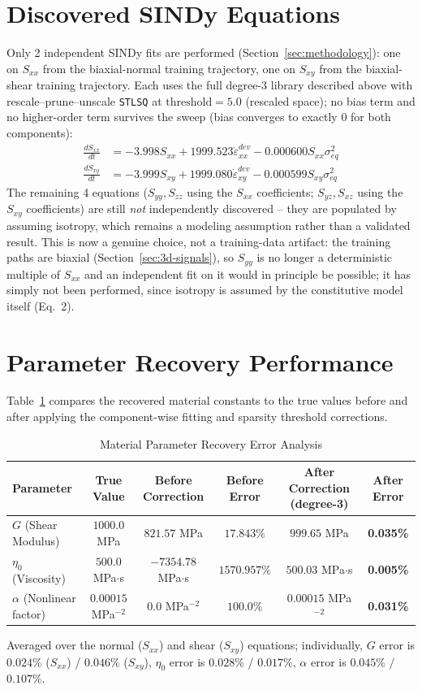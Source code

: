 \documentclass{article}
\begin{document}
\section{Discovered SINDy Equations}
\label{sec:results-degree3}
Only 2 independent SINDy fits are performed (Section~\ref{sec:methodology}): one on $S_{xx}$ from the biaxial-normal training trajectory, one on $S_{xy}$ from the biaxial-shear training trajectory. Each uses the full degree-3 library described above with rescale--prune--unscale \texttt{STLSQ} at $\text{threshold}=5.0$ (rescaled space); no bias term and no higher-order term survives the sweep (bias converges to exactly $0$ for both components):
\begin{align*}
    \frac{d S_{xx}}{dt} &= -3.998 S_{xx} + 1999.523 \dot{\varepsilon}^{dev}_{xx} - 0.000600 S_{xx} \sigma_{eq}^2 \\
    \frac{d S_{xy}}{dt} &= -3.999 S_{xy} + 1999.080 \dot{\varepsilon}^{dev}_{xy} - 0.000599 S_{xy} \sigma_{eq}^2
\end{align*}
The remaining 4 equations ($S_{yy}, S_{zz}$ using the $S_{xx}$ coefficients; $S_{yz}, S_{xz}$ using the $S_{xy}$ coefficients) are still \emph{not} independently discovered -- they are populated by assuming isotropy, which remains a modeling assumption rather than a validated result. This is now a genuine choice, not a training-data artifact: the training paths are biaxial (Section~\ref{sec:3d-signals}), so $S_{yy}$ is no longer a deterministic multiple of $S_{xx}$ and an independent fit on it would in principle be possible; it has simply not been performed, since isotropy is assumed by the constitutive model itself (Eq.~2).

\section{Parameter Recovery Performance}
Table~\ref{tab:parameters} compares the recovered material constants to the true values before and after applying the component-wise fitting and sparsity threshold corrections.

\begin{table}[h]
\centering
\caption{Material Parameter Recovery Error Analysis}
\label{tab:parameters}
\begin{tabular}{lccccc}
\toprule
Parameter & True Value & Before Correction & Before Error & After Correction (degree-3) & After Error \\
\midrule
$G$ (Shear Modulus) & $1000.0$ MPa & $821.57$ MPa & $17.843\%$ & $999.65$ MPa & \textbf{0.035\%} \\
$\eta_0$ (Viscosity) & $500.0$ MPa$\cdot$s & $-7354.78$ MPa$\cdot$s & $1570.957\%$ & $500.03$ MPa$\cdot$s & \textbf{0.005\%} \\
$\alpha$ (Nonlinear factor) & $0.00015$ MPa$^{-2}$ & $0.0$ MPa$^{-2}$ & $100.0\%$ & $0.00015$ MPa$^{-2}$ & \textbf{0.031\%} \\
\bottomrule
\end{tabular}
\end{table}
Averaged over the normal ($S_{xx}$) and shear ($S_{xy}$) equations; individually, $G$ error is $0.024\%$ ($S_{xx}$) / $0.046\%$ ($S_{xy}$), $\eta_0$ error is $0.028\%$ / $0.017\%$, $\alpha$ error is $0.045\%$ / $0.107\%$.
\end{document}
